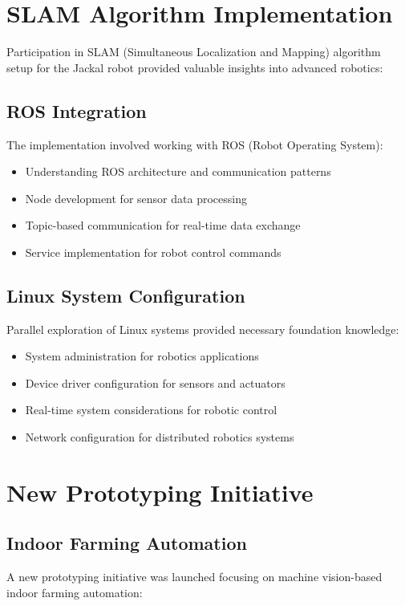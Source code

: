 \documentclass{book}
\begin{document}
\section{SLAM Algorithm Implementation}
\par\noindent Participation in SLAM (Simultaneous Localization and Mapping) algorithm setup for the Jackal robot provided valuable insights into advanced robotics:

\subsection{ROS Integration}
\par\noindent The implementation involved working with ROS (Robot Operating System):

\begin{itemize}
\item Understanding ROS architecture and communication patterns
\item Node development for sensor data processing
\item Topic-based communication for real-time data exchange
\item Service implementation for robot control commands
\end{itemize}

\subsection{Linux System Configuration}
\par\noindent Parallel exploration of Linux systems provided necessary foundation knowledge:

\begin{itemize}
\item System administration for robotics applications
\item Device driver configuration for sensors and actuators
\item Real-time system considerations for robotic control
\item Network configuration for distributed robotics systems
\end{itemize}

\section{New Prototyping Initiative}

\subsection{Indoor Farming Automation}
\par\noindent A new prototyping initiative was launched focusing on machine vision-based indoor farming automation:
\end{document}
